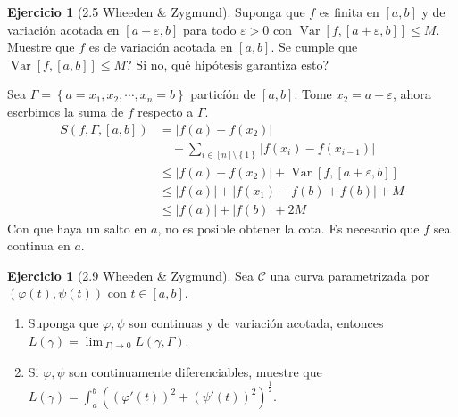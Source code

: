 \documentclass[12pt]{article}
\theoremstyle{plain}
\theoremstyle{definition}
\newtheorem{Ej}[Th]{Ejercicio}
\theoremstyle{remark}
\numberwithin{equation}{section}
\DeclareMathOperator{\Var}{Var}     %
\newcommand{\cC}{\mathcal{C}}       %
\renewcommand{\leq}{\leqslant}      %
\renewcommand{\:}{\colon}           %
\newcommand{\conj}[1]{\left\lbrace#1\right\rbrace}
\newcommand{\bonj}[1]{\left\lbrack#1\right\rbrack}
\begin{document}
\begin{multicols}{2}
\begin{Ej}[2.5 Wheeden \& Zygmund]
  Suponga que $f$ es finita en $\bonj{a,b}$ y de variación acotada en $\bonj{a+\varepsilon,b}$ para todo $\varepsilon>0$ con $\Var\bonj{f,\bonj{a+\varepsilon,b}}\leq M$. Muestre que $f$ es de variación acotada en $\bonj{a,b}$. Se cumple que $\Var\bonj{f,\bonj{a,b}}\leq M$? Si no, qué hipótesis garantiza esto?
\end{Ej}

\begin{ptcbp}
Sea $\Gamma=\conj{a=x_1,x_2,\cdots,x_n=b}$ particíón de $\bonj{a,b}$. Tome $x_2=a+\varepsilon$, ahora escrbimos la suma de $f$ respecto a $\Gamma$.
\begin{align*}
  S(f,\Gamma,\bonj{a,b}) &=|f(a)-f(x_2)|\\
  &\quad +\sum_{i\in\bonj{n}\setminus\conj{1}}|f(x_i)-f(x_{i-1})|\\
  &\leq |f(a)-f(x_2)|+\Var\bonj{f,\bonj{a+\varepsilon,b}}\\
  &\leq |f(a)|+|f(x_1)-f(b)+f(b)|+M\\
  &\leq |f(a)|+|f(b)|+2M
\end{align*}
Con que haya un salto en $a$, no es posible obtener la cota. Es necesario que $f$ sea continua en $a$.
\end{ptcbp}

\begin{Ej}[2.9 Wheeden \& Zygmund]
  Sea $\cC$ una curva parametrizada por $(\varphi(t),\psi(t))$ con $t\in\bonj{a,b}$.
  \begin{enumerate}
    \item Suponga que $\varphi,\psi$ son continuas y de variación acotada, entonces $L(\gamma)=\lim_{|\Gamma|\to 0}L(\gamma,\Gamma)$.
        \item Si $\varphi,\psi$ son continuamente diferenciables, muestre que $L(\gamma)=\int_{a}^{b}\left((\varphi'(t))^2+(\psi'(t))^2\right)^{\frac{1}{2}}$.
  \end{enumerate}
\end{Ej}


\end{multicols}
\end{document}
